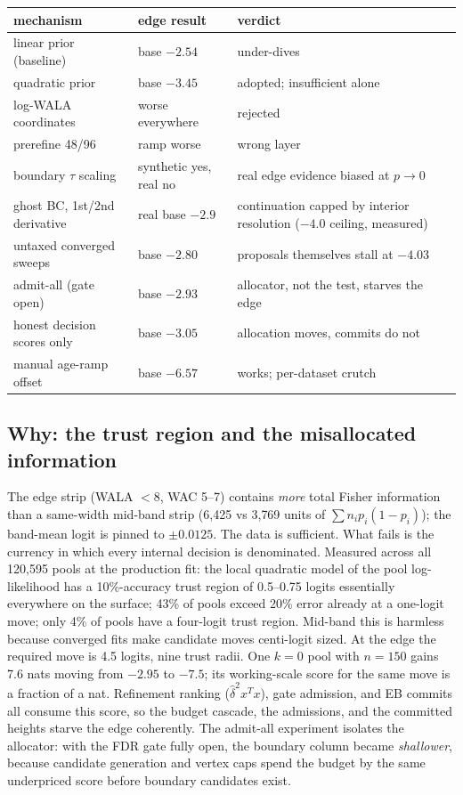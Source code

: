 \documentclass[11pt]{article}
\begin{document}
\begin{center}
\begin{tabular}{p{4.6cm}p{3.1cm}p{5.6cm}}
\toprule
mechanism & edge result & verdict \\
\midrule
linear prior (baseline) & base $-2.54$ & under-dives \\
quadratic prior & base $-3.45$ & adopted; insufficient alone \\
log-WALA coordinates & worse everywhere & rejected \\
prerefine 48/96 & ramp worse & wrong layer \\
boundary $\tau$ scaling & synthetic yes, real no & real edge evidence biased at $p\to0$ \\
ghost BC, 1st/2nd derivative & real base $-2.9$ & continuation capped by interior resolution ($-4.0$ ceiling, measured) \\
untaxed converged sweeps & base $-2.80$ & proposals themselves stall at $-4.03$ \\
admit-all (gate open) & base $-2.93$ & allocator, not the test, starves the edge \\
honest decision scores only & base $-3.05$ & allocation moves, commits do not \\
manual age-ramp offset & base $-6.57$ & works; per-dataset crutch \\
\bottomrule
\end{tabular}
\end{center}

\subsection{Why: the trust region and the misallocated information}

The edge strip (WALA $<8$, WAC 5--7) contains \emph{more} total Fisher
information than a same-width mid-band strip (6{,}425 vs 3{,}769 units
of $\sum n_i p_i(1-p_i)$); the band-mean logit is pinned to
$\pm 0.0125$. The data is sufficient. What fails is the currency in
which every internal decision is denominated. Measured across all
120{,}595 pools at the production fit: the local quadratic model of
the pool log-likelihood has a 10\%-accuracy trust region of 0.5--0.75
logits essentially everywhere on the surface; 43\% of pools exceed
20\% error already at a one-logit move; only 4\% of pools have a
four-logit trust region. Mid-band this is harmless because converged
fits make candidate moves centi-logit sized. At the edge the required
move is 4.5 logits, nine trust radii. One $k=0$ pool with $n=150$
gains 7.6 nats moving from $-2.95$ to $-7.5$; its working-scale score
for the same move is a fraction of a nat. Refinement ranking
($\hat\delta^2 x^Tx$), gate admission, and EB commits all consume this
score, so the budget cascade, the admissions, and the committed
heights starve the edge coherently. The admit-all experiment isolates
the allocator: with the FDR gate fully open, the boundary column
became \emph{shallower}, because candidate generation and vertex caps
spend the budget by the same underpriced score before boundary
candidates exist.
\end{document}
